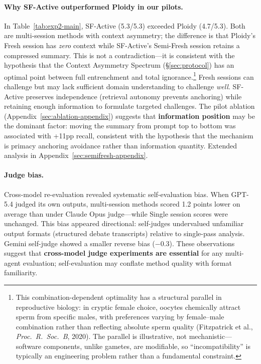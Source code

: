 \documentclass{article}
\begin{document}
\paragraph{Why SF-Active outperformed Ploidy in our pilots.} In Table~\ref{tab:exp2-main}, SF-Active (5.3/5.3) exceeded Ploidy (4.7/5.3). Both are multi-session methods with context asymmetry; the difference is that Ploidy's Fresh session has \emph{zero} context while SF-Active's Semi-Fresh session retains a compressed summary. This is not a contradiction---it is consistent with the hypothesis that the Context Asymmetry Spectrum (\S\ref{sec:protocol}) has an optimal point between full entrenchment and total ignorance.\footnote{This combination-dependent optimality has a structural parallel in reproductive biology: in cryptic female choice, oocytes chemically attract sperm from specific males, with preferences varying by female--male combination rather than reflecting absolute sperm quality (Fitzpatrick et al., \textit{Proc.\ R.\ Soc.\ B}, 2020). The parallel is illustrative, not mechanistic---software components, unlike gametes, are modifiable, so ``incompatibility'' is typically an engineering problem rather than a fundamental constraint.} Fresh sessions can challenge but may lack sufficient domain understanding to challenge \emph{well}. SF-Active preserves independence (retrieval autonomy prevents anchoring) while retaining enough information to formulate targeted challenges. The pilot ablation (Appendix~\ref{sec:ablation-appendix}) suggests that \textbf{information position} may be the dominant factor: moving the summary from prompt top to bottom was associated with +11pp recall, consistent with the hypothesis that the mechanism is primacy anchoring avoidance rather than information quantity. Extended analysis in Appendix~\ref{sec:semifresh-appendix}.

\paragraph{Judge bias.} Cross-model re-evaluation revealed systematic self-evaluation bias. When GPT-5.4 judged its own outputs, multi-session methods scored 1.2 points lower on average than under Claude Opus judge---while Single session scores were unchanged. This bias appeared directional: self-judges undervalued unfamiliar output formats (structured debate transcripts) relative to single-pass analysis. Gemini self-judge showed a smaller reverse bias ($-$0.3). These observations suggest that \textbf{cross-model judge experiments are essential} for any multi-agent evaluation; self-evaluation may conflate method quality with format familiarity.
\end{document}
